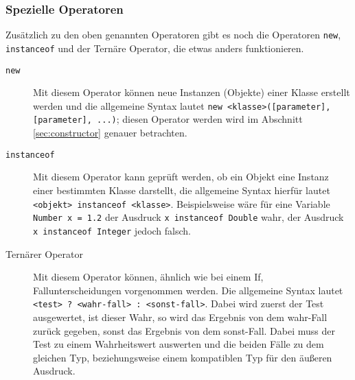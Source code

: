 	\subsubsection{Spezielle Operatoren}
		Zusätzlich zu den oben genannten Operatoren gibt es noch die Operatoren \lstinline|new|, \lstinline|instanceof| und der Ternäre Operator, die etwas anders funktionieren.
		\begin{description}
			\item[\lstinline|new|] Mit diesem Operator können neue Instanzen (Objekte) einer Klasse erstellt werden und die allgemeine Syntax lautet \lstinline|new <klasse>([parameter], [parameter], ...)|; diesen Operator werden wird im Abschnitt \ref{sec:constructor} genauer betrachten.
			\item[\lstinline|instanceof|] Mit diesem Operator kann geprüft werden, ob ein Objekt eine Instanz einer bestimmten Klasse darstellt, die allgemeine Syntax hierfür lautet \lstinline|<objekt> instanceof <klasse>|. Beispielsweise wäre für eine Variable \lstinline|Number x = 1.2| der Ausdruck \lstinline|x instanceof Double| wahr, der Ausdruck \lstinline|x instanceof Integer| jedoch falsch.
			\item[Ternärer Operator] Mit diesem Operator können, ähnlich wie bei einem If, Fallunterscheidungen vorgenommen werden. Die allgemeine Syntax lautet \lstinline|<test> ? <wahr-fall> : <sonst-fall>|. Dabei wird zuerst der Test ausgewertet, ist dieser Wahr, so wird das Ergebnis von dem wahr-Fall zurück gegeben, sonst das Ergebnis von dem sonst-Fall. Dabei muss der Test zu einem Wahrheitswert auswerten und die beiden Fälle zu dem gleichen Typ, beziehungsweise einem kompatiblen Typ für den äußeren Ausdruck.
		\end{description}
	
